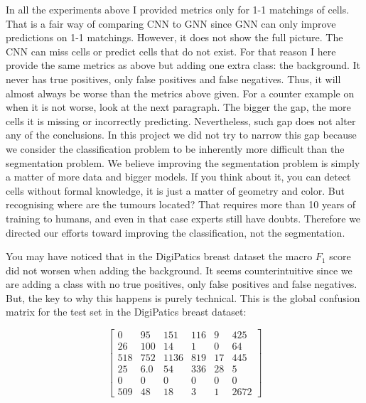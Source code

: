 In all the experiments above I provided metrics only for 1-1 matchings of cells. That is a fair way of comparing CNN to GNN since GNN can only improve predictions on 1-1 matchings. However, it does not show the full picture. The CNN can miss cells or predict cells that do not exist. For that reason I here provide the same metrics as above but adding one extra class: the background. It never has true positives, only false positives and false negatives. Thus, it will almost always be worse than the metrics above given. For a counter example on when it is not worse, look at the next paragraph. The bigger the gap, the more cells it is missing or incorrectly predicting. Nevertheless, such gap does not alter any of the conclusions. In this project we did not try to narrow this gap because we consider the classification problem to be inherently more difficult than the segmentation problem. We believe improving the segmentation problem is simply a matter of more data and bigger models. If you think about it, you can detect cells without formal knowledge, it is just a matter of geometry and color. But recognising where are the tumours located? That requires more than 10 years of training to humans, and even in that case experts still have doubts. Therefore we directed our efforts toward improving the classification, not the segmentation.

You may have noticed that in the DigiPatics breast dataset the macro $F_1$ score did not worsen when adding the background. It seems counterintuitive since we are adding a class with no true positives, only false positives and false negatives. But, the key to why this happens is purely technical. This is the global confusion matrix for the test set in the DigiPatics breast dataset:

\[
\begin{bmatrix}
0 & 95 & 151 & 116 & 9 & 425 \\
26 & 100 & 14 & 1 & 0 & 64 \\
518 & 752 & 1136 & 819 & 17 & 445 \\
25 & 6.0 & 54 & 336 & 28 & 5 \\
0 & 0 & 0 & 0 & 0 & 0 \\
509 & 48 & 18 & 3 & 1 & 2672
\end{bmatrix}
\]

